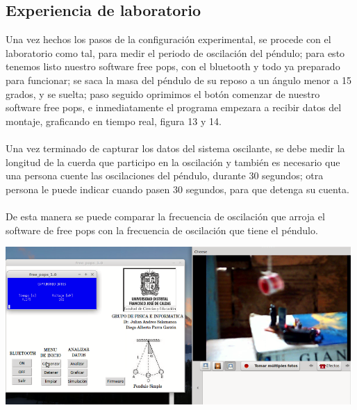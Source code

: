 \documentclass[12pt]{article}
\newenvironment{Figure}
{\par\medskip\noindent\minipage{\linewidth}}
{\endminipage\par\medskip}
\begin{document}
\begin{multicols}{2}
\section{Experiencia de laboratorio}
Una vez hechos los pasos de la configuración experimental, se procede con el laboratorio como tal, para medir el periodo de oscilación del péndulo; para esto tenemos listo nuestro software free pops, con el bluetooth y todo ya preparado para funcionar; se saca la masa del péndulo de su reposo a un ángulo menor a 15 grados, y se suelta; paso seguido oprimimos el botón comenzar de nuestro software free pops, e inmediatamente el programa empezara a recibir datos del montaje, graficando en tiempo real, figura 13 y 14.
\\ \\
Una vez terminado de capturar los datos del sistema oscilante,  se debe medir la longitud de la cuerda que participo en la oscilación y también es necesario que una persona cuente las oscilaciones del péndulo, durante 30 segundos; otra persona le puede indicar cuando pasen 30 segundos, para que detenga su cuenta.
\\ \\
De esta manera se puede comparar la frecuencia de oscilación  que arroja el software de free pops con la frecuencia de oscilación que tiene el péndulo.

\vspace{0.6 cm}
\begin{Figure}
\center
\includegraphics[width=8.cm, height=6cm]{fig/graf2.png}
\label{fig:g13}
\end{Figure}
\vspace{0.2cm}




\end{multicols}
\end{document}

